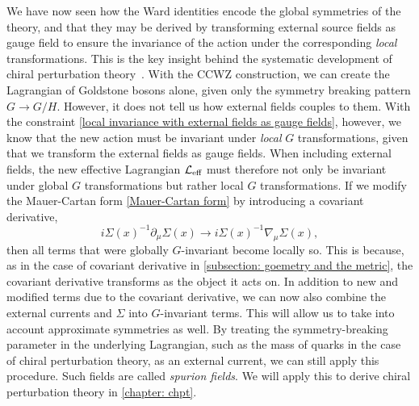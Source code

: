 We have now seen how the Ward identities encode the global symmetries of the theory, and that they may be derived by transforming external source fields as gauge field to ensure the invariance of the action under the corresponding \emph{local} transformations.
This is the key insight behind the systematic development of chiral perturbation theory~\autocite{gasserChiralPerturbationTheory1984,gasserChiralPerturbationTheory1985,leutwylerFoundationsChiralPerturbation1994}.
With the CCWZ construction, we can create the Lagrangian of Goldstone bosons alone, given only the symmetry breaking pattern $G \rightarrow G/H$.
However, it does not tell us how external fields couples to them.
With the constraint \autoref{local invariance with external fields as gauge fields}, however, we know that the new action must be invariant under \emph{local} $G$ transformations, given that we transform the external fields as gauge fields.
When including external fields, the new effective Lagrangian $\mathcal{L}_\text{eff}$ must therefore not only be invariant under global $G$ transformations but rather local $G$ transformations.
If we modify the Mauer-Cartan form \autoref{Mauer-Cartan form} by introducing a covariant derivative,
%
\begin{equation}
    i\Sigma(x)^{-1} \partial_\mu \Sigma(x)
    \rightarrow i\Sigma(x)^{-1} \nabla_\mu \Sigma(x),
\end{equation}
%
then all terms that were globally $G$-invariant become locally so.
This is because, as in the case of covariant derivative in \autoref{subsection: goemetry and the metric}, the covariant derivative transforms as the object it acts on.
In addition to new and modified terms due to the covariant derivative, we can now also combine the external currents and $\Sigma$ into $G$-invariant terms.
This will allow us to take into account approximate symmetries as well.
By treating the symmetry-breaking parameter in the underlying Lagrangian, such as the mass of quarks in the case of chiral perturbation theory, as an external current, we can still apply this procedure.
Such fields are called \emph{spurion fields}.
We will apply this to derive chiral perturbation theory in \autoref{chapter: chpt}.

